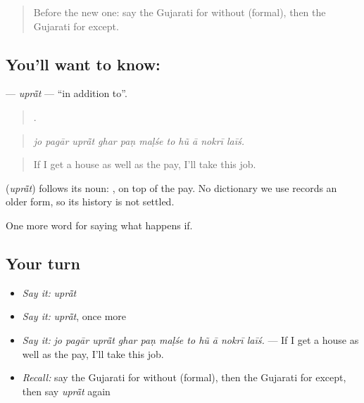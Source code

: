 \label{lesson:GU-C546-uprat}



\begin{quote}
Before the new one: say the Gujarati for without (formal), then the Gujarati for except.
\end{quote}

\subsection*{You'll want to know: }
\textbf{} — \emph{uprā̃t} — \textquotedblleft{}in addition to\textquotedblright{}.

\begin{quote}
          .
\end{quote}

\begin{quote}
\emph{jo pagār uprā̃t ghar paṇ maḷśe to hũ ā nokrī laīś.}
\end{quote}

\begin{quote}
If I get a house as well as the pay, I'll take this job.
\end{quote}

\begin{cousinweb}
\textbf{} (\emph{uprā̃t}) follows its noun: \textbf{ }, on top of the pay. No dictionary we use records an older form, so its history is not settled.
\end{cousinweb}

\begin{grammarlens}[title={What you've built}]
One more word for saying what happens if.
\end{grammarlens}

\subsection*{Your turn}
\begin{itemize}
\raggedright
  \item \emph{Say it:} \emph{uprā̃t}
  \item \emph{Say it:} \emph{uprā̃t}, once more
  \item \emph{Say it:} \emph{jo pagār uprā̃t ghar paṇ maḷśe to hũ ā nokrī laīś.} — If I get a house as well as the pay, I'll take this job.
  \item \emph{Recall:} say the Gujarati for without (formal), then the Gujarati for except, then say \emph{uprā̃t} again
\end{itemize}

